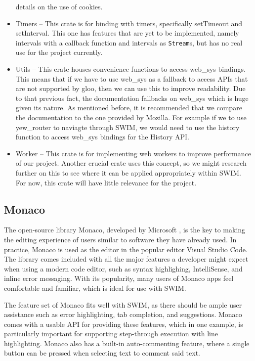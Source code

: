 \documentclass[
    paper=letter,
    parskip=half,
    fontsize=12pt,
    titlepage=firstiscover,
    toc=bibliography,
    numbers=endperiod
]{scrartcl}
\begin{document}
\begin{itemize}
          details on the use of cookies.
    \item Timers -- This crate is for binding with timers, specifically setTimeout
          and setInterval. This one has features that are yet to be implemented,
          namely intervals with a callback function and intervals as
          \texttt{Stream}s, but has no real use for the project currently.
    \item Utils -- This crate houses convenience functions to access web\_sys
          bindings. This means that if we have to use web\_sys as a fallback to
          access APIs that are not supported by gloo, then we can use this to
          improve readability. Due to that previous fact, the documentation
          fallbacks on web\_sys which is huge given its nature. As mentioned
          before, it is recommended that we compare the documentation to the one
          provided by Mozilla. For example if we to use yew\_router to naviagte
          through SWIM, we would need to use the history function to access
          web\_sys bindings for the History API.
    \item Worker -- This crate is for implementing web workers to improve
          performance of our project. Another crucial crate uses this concept,
          so we might research further on this to see where it can be applied
          appropriately within SWIM. For now, this crate will have little
          relevance for the project.
\end{itemize}

\subsection{Monaco}
\label{subsec:monaco}

The open-source library Monaco, developed by Microsoft \cite{monaco}, is
the key to making the editing experience of users similar to software
they have already used. In practice, Monaco is used as the editor in the
popular editor Visual Studio Code. The library comes included with all
the major features a developer might expect when using a modern code
editor, such as syntax highlighing, IntelliSense, and inline error
messaging. With its popularity, many users of Monaco apps feel
comfortable and familiar, which is ideal for use with SWIM.

The feature set of Monaco fits well with SWIM, as there should be ample
user assistance such as error highlighting, tab completion, and
suggestions. Monaco comes with a usable API for providing these
features, which in one example, is particularly important for supporting
step-through execution with line highlighting. Monaco also has a
built-in auto-commenting feature, where a single button can be pressed
when selecting text to comment said text.
\end{document}
